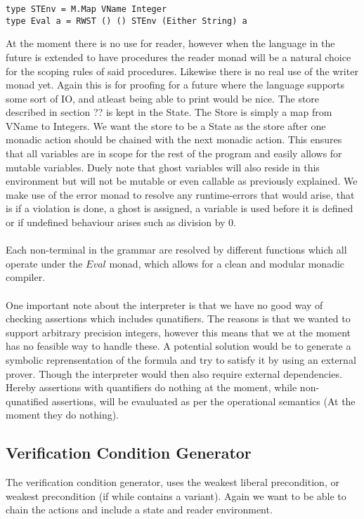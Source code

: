 \begin{lstlisting}
type STEnv = M.Map VName Integer
type Eval a = RWST () () STEnv (Either String) a
\end{lstlisting}

At the moment there is no use for reader, however when the language in the future is extended to have procedures the reader monad will be a natural choice for the scoping rules of said procedures.
Likewise there is no real use of the writer monad yet. Again this is for proofing for a future where the language supports some sort of IO, and atleast being able to print would be nice.
The store described in section ?? is kept in the State. The Store is simply a map from VName to Integers. We want the store to be a State as the store after one monadic action should be chained with the next monadic action. This ensures that all variables are in scope for the rest of the program and easily allows for mutable variables.
Duely note that ghost variables will also reside in this environment but will not be mutable or even callable as previously explained.
We make use of the error monad to resolve any runtime-errors that would arise, that is if a violation is done, a ghost is assigned, a variable is used before it is defined or if undefined behaviour arises such as division by 0.
\\~\\
Each non-terminal in the grammar are resolved by different functions which all operate under the $Eval$ monad, which allows for a clean and modular monadic compiler.
\\~\\
One important note about the interpreter is that we have no good way of checking assertions which includes qunatifiers. The reasons is that we wanted to support arbitrary precision integers, however this means that we at the moment has no feasible way to handle these. A potential solution would be to generate a symbolic reprensentation of the formula and try to satisfy it by using an external prover. Though the interpreter would then also require external dependencies. Hereby assertions with quantifiers do nothing at the moment, while non-qunatified assertions, will be evauluated as per the operational semantics (At the moment they do nothing).

\subsection{Verification Condition Generator}
The verification condition generator, uses the weakest liberal precondition, or weakest precondition (if while contains a variant). Again we want to be able to chain the actions and include a state and reader environment.

